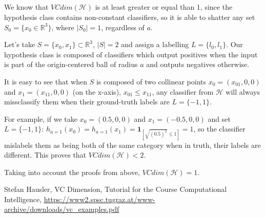 \documentclass{article}
\begin{document}
\subsection{}
We know that $VCdim(\mathcal{H})$ is at least greater or equal than 1, since the hypothesis class contains non-constant classifiers, so it is able to shatter any set $S_0=\{x_0\in\mathbb{R}^3\}$, where $|S_0|=1$, regardless of $a$.

Let's take $S=\{x_0, x_1\}\subset\mathbb{R}^3$, $|S|=2$ and assign a labelling $L=\{l_0,l_1\}$. Our hypothesis class is composed of classifiers which output positives when the input is part of the origin-centered ball of radius $a$ and outputs negatives otherwise.

It is easy to see that when $S$ is composed of two collinear points $x_0=(x_{01},0,0)$ and $x_1=(x_{11},0,0)$ (on the x-axis), $x_{01} \leq x_{11}$, any classifier from $\mathcal{H}$ will always missclassify them when their ground-truth labels are $L=\{-1,1\}$. 

For example, if we take $x_0 = (0.5,0,0)$ and $x_1=(-0.5,0,0)$ and set $L=\{-1,1\}$: $h_{a=1}(x_0) = h_{a=1}(x_1) =\mathbf{1}_{[\sqrt{(0.5)^2}\leq 1]}=1$, so the classifier mislabels them as being both of the same category when in truth, their labels are different. This proves that $VCdim(\mathcal{H}) < 2$.

Taking into account the proofs from above, $VCdim(\mathcal{H}) = 1$.
\newpage

\begin{thebibliography}{1.7} 
	 \color{cyan}Stefan Hausler, VC Dimension, Tutorial for the Course Computational Intelligence, \url{https://www2.spsc.tugraz.at/www-archive/downloads/vc_examples.pdf} \color{black}
	
\end{thebibliography}
\end{document}
